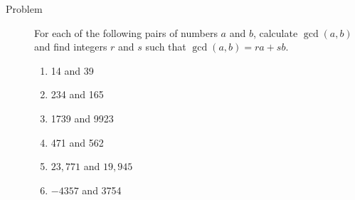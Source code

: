 \begin{description}
\item[Problem] For each of the following pairs of numbers $a$ and $b$,
calculate $\gcd(a, b)$ and find integers $r$ and $s$ such that $\gcd(a, b) =
ra + sb$.
\begin{multicols}{2}\begin{enumerate}
\item 14 and 39
\item 234 and 165
\item 1739 and 9923
\item 471 and 562
\item $23,771$ and $19,945$
\item $-4357$ and 3754
\end{enumerate}\end{multicols}


\end{description}
